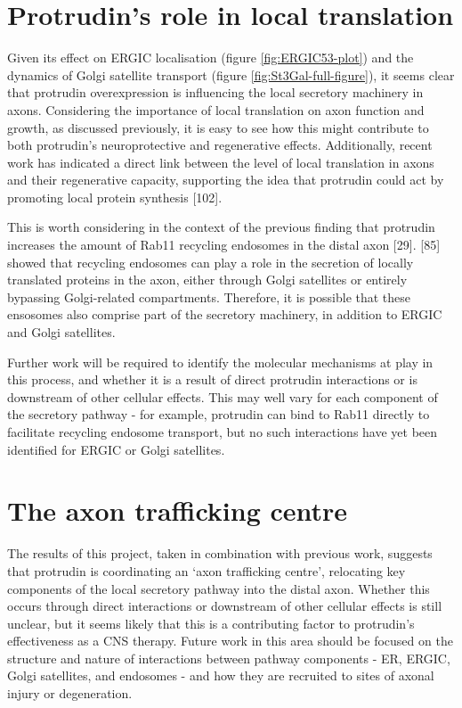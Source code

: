 \documentclass[
  12pt,
  a4paper,
]{book}
\begin{document}
\hypertarget{protrudins-role-in-local-translation}{%
\section{Protrudin's role in local translation}\label{protrudins-role-in-local-translation}}

Given its effect on ERGIC localisation (figure \ref{fig:ERGIC53-plot}) and the dynamics of Golgi satellite transport (figure \ref{fig:St3Gal-full-figure}), it seems clear that protrudin overexpression is influencing the local secretory machinery in axons. Considering the importance of local translation on axon function and growth, as discussed previously, it is easy to see how this might contribute to both protrudin's neuroprotective and regenerative effects. Additionally, recent work has indicated a direct link between the level of local translation in axons and their regenerative capacity, supporting the idea that protrudin could act by promoting local protein synthesis {[}102{]}.

This is worth considering in the context of the previous finding that protrudin increases the amount of Rab11 recycling endosomes in the distal axon {[}29{]}. {[}85{]} showed that recycling endosomes can play a role in the secretion of locally translated proteins in the axon, either through Golgi satellites or entirely bypassing Golgi-related compartments. Therefore, it is possible that these ensosomes also comprise part of the secretory machinery, in addition to ERGIC and Golgi satellites.

Further work will be required to identify the molecular mechanisms at play in this process, and whether it is a result of direct protrudin interactions or is downstream of other cellular effects. This may well vary for each component of the secretory pathway - for example, protrudin can bind to Rab11 directly to facilitate recycling endosome transport, but no such interactions have yet been identified for ERGIC or Golgi satellites.

\hypertarget{the-axon-trafficking-centre}{%
\section{The axon trafficking centre}\label{the-axon-trafficking-centre}}

The results of this project, taken in combination with previous work, suggests that protrudin is coordinating an `axon trafficking centre', relocating key components of the local secretory pathway into the distal axon. Whether this occurs through direct interactions or downstream of other cellular effects is still unclear, but it seems likely that this is a contributing factor to protrudin's effectiveness as a CNS therapy. Future work in this area should be focused on the structure and nature of interactions between pathway components - ER, ERGIC, Golgi satellites, and endosomes - and how they are recruited to sites of axonal injury or degeneration.
\end{document}
